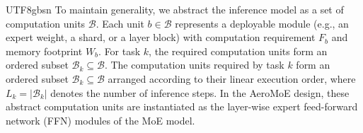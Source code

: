 \documentclass[journal]{IEEEtran}
\begin{document}
\begin{CJK*}{UTF8}{gbsn}
To maintain generality, we abstract the inference model as a set of computation units \(\mathcal{B}\). Each unit \(b \in \mathcal{B}\) represents a deployable module (e.g., an expert weight, a shard, or a layer block) with computation requirement \(F_b\) and memory footprint \(W_b\). For task \(k\), the required computation units form an ordered subset \(\mathcal{B}_k \subseteq \mathcal{B}\).
The computation units required by task \(k\) form an ordered subset \(\mathcal{B}_k \subseteq \mathcal{B}\) arranged according to their linear execution order, where \(L_k = |\mathcal{B}_k|\) denotes the number of inference steps. In the AeroMoE design, these abstract computation units are instantiated as the layer-wise expert feed-forward network (FFN) modules of the MoE model.



\end{CJK*}
\end{document}
